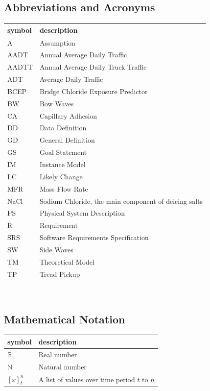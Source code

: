\documentclass[12pt]{article}
\begin{document}
\subsection{Abbreviations and Acronyms}

\renewcommand{\arraystretch}{1.2}
\begin{tabular}{l l} 
  \toprule		
  \textbf{symbol} & \textbf{description}\\
  \midrule 
A & Assumption\\
AADT & Annual Average Daily Traffic\\
AADTT & Annual Average Daily Truck Traffic\\
ADT & Average Daily Traffic\\
BCEP & Bridge Chloride Exposure Predictor \\
BW & Bow Waves\\
CA & Capillary Adhesion\\
DD & Data Definition\\
GD & General Definition\\
GS & Goal Statement\\
IM & Instance Model\\
LC & Likely Change\\
MFR & Mass Flow Rate\\
NaCl & Sodium Chloride, the main component of deicing salts\\
PS & Physical System Description\\
R & Requirement\\
SRS & Software Requirements Specification\\
SW & Side Waves\\
TM & Theoretical Model\\
TP & Tread Pickup\\

  \bottomrule
\end{tabular}\\

\subsection{Mathematical Notation}
\renewcommand{\arraystretch}{1.2}
\begin{tabular}{l l} 
  \toprule		
  \textbf{symbol} & \textbf{description}\\
  \midrule 
  $\mathbb{R}$ & Real number \\
  $\mathbb{N}$ & Natural number \\
  $[x]_t^n$ & A list of values over time period $t$ to $n$ \\

  \bottomrule
\end{tabular}\\
\end{document}

